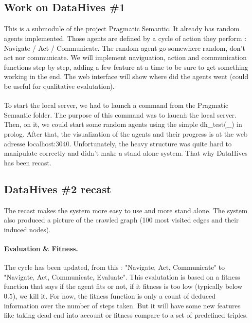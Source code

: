 \documentclass{article}
\begin{document}
	\subsection{Work on DataHives \#1}
		\paragraph{} This is a submodule of the project Pragmatic Semantic.
		It already has random agents implemented.
		Those agents are defined by a cycle of action they perform : Navigate / Act / Communicate.
		The random agent go somewhere random, don't act nor communicate.
		We will implement naviguation, action and communication functions step by step,
		adding a few feature at a time to be sure to get something working in the end.
		The web interface will show where did the agents went (could be useful for qualitative evalutation).
		\paragraph{} To start the local server, we had to launch a command from the Pragmatic Semantic folder.
		The purpose of this command was to laucnh the local server.
		Then, on it, we could start some random agents using the simple dh\_test(\_) in prolog.
		After that, the visualization of the agents and their progress is at the web adresse localhost:3040.
		Unfortunately, the heavy structure was quite hard to manipulate correctly and didn't make a stand alone system.
		That why DataHives has been recast.
	\subsection{DataHives \#2 recast}
		\paragraph{} The recast makes the system more easy to use and more stand alone.
			The system also produced a picture of the crawled graph (100 most visited edges and their induced nodes).
		\paragraph{Evaluation \& Fitness.} The cycle has been updated, from this :
			"Navigate, Act, Communicate" to "Navigate, Act, Communicate, Evaluate".
			This evalutation is based on a fitness function that says if the agent fits or not,
			if it fitness is too low (typically below $0.5$), we kill it.
			For now, the fitness function is only a count of deduced information over the number of steps taken.
			But it will have some new features like taking dead end into account or
			fitness compare to a set of predefined triples.
\end{document}

